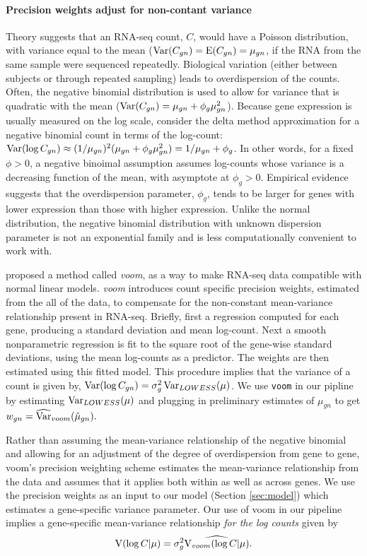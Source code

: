 \paragraph{Precision weights adjust for non-contant variance}
Theory suggests that an RNA-seq count, $C$, would have a Poisson distribution, with variance equal to the mean ($\operatorname{Var}(C_{gn})=\operatorname{E}(C_{gn})=\mu_{gn}$, if the RNA from the same sample were sequenced repeatedly. Biological variation (either between subjects or through repeated sampling) leads to overdispersion of the counts. Often, the negative binomial distribution is used to allow for variance that is quadratic with the mean ($\operatorname{Var}(C_{gn})=\mu_{gn}+\phi_g\mu_{gn}^2$). Because gene expression is usually measured on the log scale, consider the delta method  approximation for a negative binomial count in terms of the log-count: $\operatorname{Var}(\log C_{gn}) \approx (1/\mu_{gn})^2(\mu_{gn} + \phi_g\mu_{gn}^2)=1/\mu_{gn} + \phi_g$. In other words, for a fixed $\phi>0$, a negative binoimal assumption assumes log-counts whose variance is a decreasing function of the mean, with asymptote at $\phi_g>0$. Empirical evidence \citep{voom} suggests that the overdispersion parameter, $\phi_g$, tends to be larger for genes with lower expression than those with higher expression. Unlike the normal distribution, the negative binomial distribution with unknown dispersion parameter is not an exponential family and is less computationally convenient to work with.

\cite{voom} proposed a method called \textit{voom}, as a way to make RNA-seq data compatible with normal linear models. \textit{voom} introduces count specific precision weights, estimated from the all of the data, to compensate for the non-constant mean-variance relationship present in RNA-seq. Briefly, first a regression computed for each gene, producing a standard deviation and mean log-count. Next a smooth nonparametric regression is fit to the square root of the gene-wise standard deviations, using the mean log-counts as a predictor. The weights are then estimated using this fitted model. This procedure implies that the variance of a count is given by, $\operatorname{Var}(\log C_{gn})=\sigma_{g}^2\operatorname{Var}_{LOWESS}(\mu)$. We use \texttt{voom} in our pipline by estimating $\operatorname{Var}_{LOWESS}(\mu)$ and plugging in preliminary estimates of $\mu_{gn}$ to get $w_{gn} = \widehat{\operatorname{Var}}_{voom}(\hat{\mu}_{gn}).$

Rather than assuming the mean-variance relationship of the negative binomial and allowing for an adjustment of the degree of overdispersion from gene to gene, voom's precision weighting scheme estimates the mean-variance relationship from the data and assumes that it applies both within as well as across genes. We use the precision weights as an input to our model (Section \ref{sec:model}) which estimates a gene-specific variance parameter. Our use of voom in our pipeline implies a gene-specific mean-variance relationship \textit{for the log counts} given by
$$\operatorname{V}(\log C|\mu)=\sigma^2_g \widehat{\operatorname{V}_{voom}(\log C|\mu)}.$$

